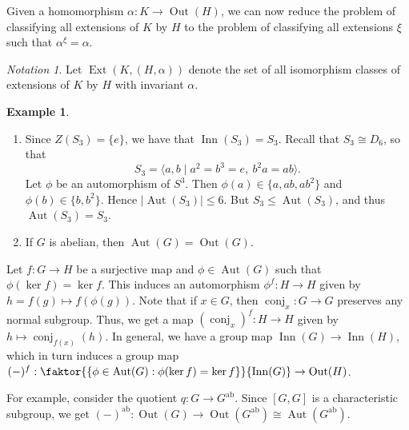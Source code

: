 \documentclass[10pt,letterpaper,cm]{nupset}
\theoremstyle{definition}
\newtheorem{exmp}[definition]{Example}
\theoremstyle{theorem}
\theoremstyle{remark}
\newtheorem*{notation}{Notation}
\newcommand{\1}{\mathbf{1}}
\newcommand{\0}{\vec 0}
\DeclareMathOperator{\aut}{Aut}
\DeclareMathOperator{\ext}{Ext}
\DeclareMathOperator{\inn}{Inn}
\DeclareMathOperator{\out}{Out}
\DeclareMathOperator{\ab}{ab}
\DeclareMathOperator{\conj}{conj}
\begin{document}
Given a homomorphism $\alpha: K \to \out(H)$, we can now reduce the problem of classifying all extensions of $K$ by $H$ to the problem of classifying all extensions $\xi$ such that $\alpha^{\xi} = \alpha$. 
\begin{notation}
Let $\ext(K, (H, \alpha))$ denote the set of all isomorphism classes of extensions of $K$ by $H$ with invariant $\alpha$.
\end{notation}

\begin{exmp} $ $
\begin{enumerate}
\item Since $Z(S_3) =\{e\}$, we have that $\inn(S_3) = S_3$. Recall that $S_3 \cong D_6$, so that $$S_3 = \langle a, b \mid a^2 = b^3 = e,\ b^2a = ab\rangle.$$ Let $\phi$ be an automorphism of $S^3$. Then $\phi(a) \in \{a, ab, ab^2\}$ and $\phi(b) \in \{b, b^2\}$. Hence $\lvert{\aut(S_3)}\rvert\leq 6$. But $S_3 \leq \aut(S_3)$, and thus $\aut(S_3) = S_3$.
\item If $G$ is abelian, then $\aut(G)= \out(G)$.
\end{enumerate}
\end{exmp}

\medskip

Let $f: G \to H$ be a surjective map and $\phi \in \aut(G)$ such that $\phi(\ker{f}) = \ker{f}$. This induces an automorphism $\phi^f : H \to H$ given by $h = f(g) \mapsto f(\phi(g))$.  Note that if $x\in G$, then $\conj_x: G \to G$ preserves any normal subgroup. Thus, we get a map $\left(\conj_x\right)^f : H \to H$ given by $h\mapsto \conj_{f(x)}(h)$. In general, we have a group map $\inn(G) \to \inn(H)$, which in turn induces a group map $(-)^f: \faktor{\left\{\phi \in \aut(G) : \phi(\ker{f})= \ker{f}\right\}}{\inn(G)} \to \out(H)$.  

For example, consider the quotient $q : G \to G^{\ab}$. Since $[G, G]$ is a characteristic subgroup, we get $(-)^{\ab} : \out(G) \to \out(G^{\ab})\cong \aut(G^{\ab})$.

\medskip
\end{document}
